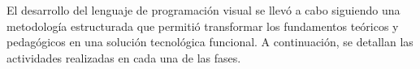 El desarrollo del lenguaje de programación visual se llevó a cabo siguiendo una metodología estructurada que permitió transformar los fundamentos teóricos y pedagógicos en una solución tecnológica funcional. A continuación, se detallan las actividades realizadas en cada una de las fases.





